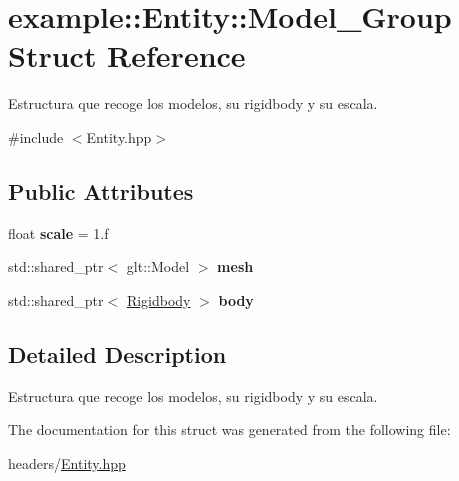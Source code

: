 \hypertarget{structexample_1_1_entity_1_1_model___group}{}\section{example\+::Entity\+::Model\+\_\+\+Group Struct Reference}
\label{structexample_1_1_entity_1_1_model___group}


Estructura que recoge los modelos, su rigidbody y su escala.  




{\ttfamily \#include $<$Entity.\+hpp$>$}

\subsection*{Public Attributes}
\begin{DoxyCompactItemize}
\item 
\mbox{\label{structexample_1_1_entity_1_1_model___group_acc9f618aff794dba7dac09d780b70fe6}} 
float {\bfseries scale} = 1.f
\item 
\mbox{\label{structexample_1_1_entity_1_1_model___group_a077b679528a5c93cde98e82960266f5d}} 
std\+::shared\+\_\+ptr$<$ glt\+::\+Model $>$ {\bfseries mesh}
\item 
\mbox{\label{structexample_1_1_entity_1_1_model___group_a95a0c8fef72ebd38190f8dca19d2b9d6}} 
std\+::shared\+\_\+ptr$<$ \mbox{\hyperlink{classexample_1_1_rigidbody}{Rigidbody}} $>$ {\bfseries body}
\end{DoxyCompactItemize}


\subsection{Detailed Description}
Estructura que recoge los modelos, su rigidbody y su escala. 



The documentation for this struct was generated from the following file\+:\begin{DoxyCompactItemize}
\item 
headers/\mbox{\hyperlink{_entity_8hpp}{Entity.\+hpp}}\end{DoxyCompactItemize}
